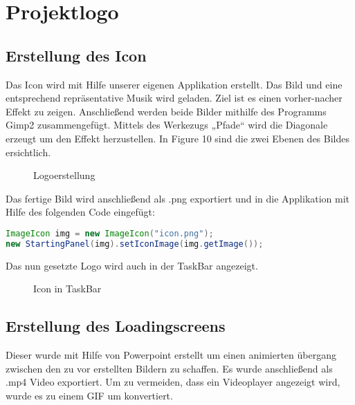 \documentclass[12pt,a4paper]{article}
\begin{document}
\section{Projektlogo}
\subsection{Erstellung des Icon}
Das Icon wird mit Hilfe unserer eigenen Applikation erstellt. Das Bild und eine entsprechend repräsentative Musik wird geladen. Ziel ist es einen vorher-nacher Effekt zu zeigen.
Anschließend werden beide Bilder mithilfe des Programms Gimp2 zusammengefügt. Mittels des Werkezugs „Pfade“ wird die Diagonale erzeugt um den Effekt herzustellen. In Figure 10 sind die zwei Ebenen des Bildes ersichtlich.
\begin{figure} [h]%
	\centering
	\label{fig:logoerstellung} 
	\caption{Logoerstellung}
\end{figure}

Das fertige Bild wird anschließend als .png exportiert und in die Applikation mit Hilfe des folgenden Code eingefügt:
\begin{lstlisting}[language=JAVA]
ImageIcon img = new ImageIcon("icon.png");
new StartingPanel(img).setIconImage(img.getImage());
\end{lstlisting}
Das nun gesetzte Logo wird auch in der TaskBar angezeigt.
\begin{figure} [h]%
	\centering
	\label{fig:iconTaskBar} 
	\caption{Icon in TaskBar}
\end{figure}

\subsection{Erstellung des Loadingscreens}
Dieser wurde mit Hilfe von Powerpoint erstellt um einen animierten übergang zwischen den zu vor erstellten Bildern zu schaffen. Es wurde anschließend als .mp4 Video exportiert. Um zu vermeiden, dass ein Videoplayer angezeigt wird, wurde es zu einem GIF um konvertiert.
\end{document}
